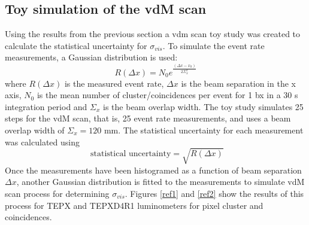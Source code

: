\subsection{Toy simulation of the vdM scan}
Using the results from the previous section a vdm scan toy study was created to calculate the statistical uncertainty for $\sigma_{vis}$. To simulate the event rate measurements, a Gaussian distribution is used:
\begin{equation}
    R(\Delta x)= N_0 e^{\frac{(\Delta x-x_0)}{2\Sigma_x^2}}
    \label{toyvdm}
\end{equation}
where $ R(\Delta x)$ is the measured event rate, $\Delta x$ is the beam separation in the x axis, $N_0$ is the mean number of cluster/coincidences per event for 1 bx in a 30 s integration period and $\Sigma_x$ is the beam overlap width. The toy study simulates 25 steps for the vdM scan, that is, 25 event rate measurements, and uses a beam overlap width of $\Sigma_x=120$ mm. The statistical uncertainty for each measurement was calculated using
\begin{equation}
    \text { statistical uncertainty}=\sqrt{R(\Delta x)}
    \label{uncvdm}
\end{equation}
Once the measurements have been histogramed as a function of beam separation $\Delta x$, another Gaussian distribution is fitted to the measurements to simulate vdM scan process for determining $\sigma_{vis}$. Figures \ref{ref1} and \ref{ref2} show the results of this process for TEPX and TEPXD4R1 luminometers for pixel cluster and coincidences.
